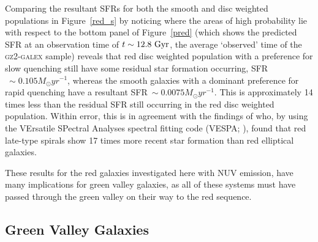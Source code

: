 Comparing the resultant SFRs for both the smooth and disc weighted populations in Figure~\ref{red_s} by noticing where the areas of high probability lie with respect to the bottom panel of Figure~\ref{pred} (which shows the predicted SFR at an observation time of $t\sim12.8~\rm{Gyr}$, the average `observed' time of the \textsc{gz2-galex} sample) reveals that red disc weighted population with a preference for slow quenching still have some residual star formation occurring, SFR$~\sim0.105 M_{\odot}yr^{-1}$, whereas the smooth galaxies with a dominant preference for rapid quenching have a resultant SFR$~\sim0.0075 M_{\odot}yr^{-1}$. This is approximately 14 times less than the residual SFR still occurring in the red disc weighted population. Within error, this is in agreement with the findings of \citet{tojeiro13} who, by using the VErsatile SPectral Analyses spectral fitting code (VESPA; \citealt{tojeiro07}), found that red late-type spirals show 17 times more recent star formation than red elliptical galaxies.

These results for the red galaxies investigated here with NUV emission, have many implications for green valley galaxies, as all of these systems must have passed through the green valley on their way to the red sequence. 

\subsection{Green Valley Galaxies}\label{gv}

